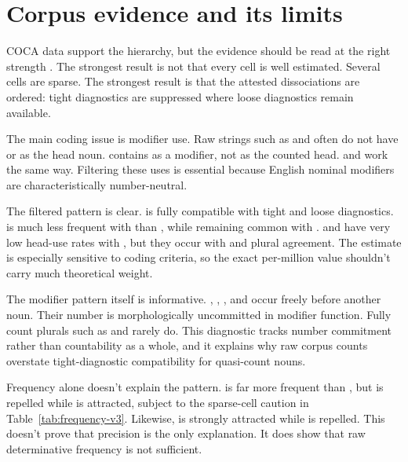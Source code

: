 \documentclass[12pt,a4paper]{article}
\begin{document}
\section{Corpus evidence and its limits}\label{sec:evidence-v3}

COCA data support the hierarchy, but the evidence should be read at the right strength \citep{davies2020coca}. The strongest result is not that every cell is well estimated. Several cells are sparse. The strongest result is that the attested dissociations are ordered: tight diagnostics are suppressed where loose diagnostics remain available.



The main coding issue is modifier use. Raw strings such as  and  often do not have  or  as the head noun.  contains  as a modifier, not as the counted head.  and  work the same way. Filtering these uses is essential because English nominal modifiers are characteristically number-neutral.

The filtered pattern is clear.  is fully compatible with tight and loose diagnostics.  is much less frequent with  than , while remaining common with .  and  have very low head-use rates with , but they occur with  and plural agreement. The  estimate is especially sensitive to coding criteria, so the exact per-million value shouldn't carry much theoretical weight.

The modifier pattern itself is informative. , , , and  occur freely before another noun. Their number is morphologically uncommitted in modifier function. Fully count plurals such as  and  rarely do. This diagnostic tracks number commitment rather than countability as a whole, and it explains why raw corpus counts overstate tight-diagnostic compatibility for quasi-count nouns.



Frequency alone doesn't explain the pattern.  is far more frequent than , but  is repelled while  is attracted, subject to the sparse-cell caution in Table~\ref{tab:frequency-v3}. Likewise,  is strongly attracted while  is repelled. This doesn't prove that precision is the only explanation. It does show that raw determinative frequency is not sufficient.
\end{document}
